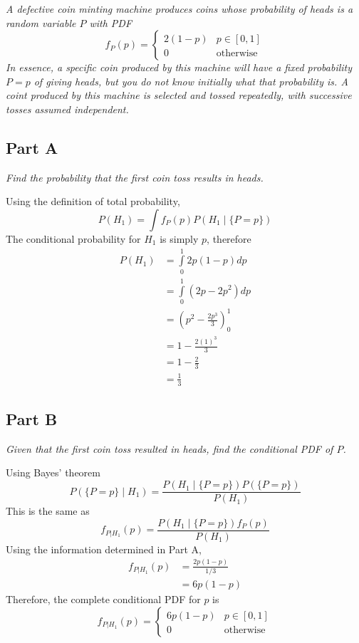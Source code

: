 \documentclass{article}
\begin{document}
\textit{A defective coin minting machine produces coins whose probability of
heads is a random variable $P$ with PDF}
$$ f_P(p) = \begin{cases}
    2(1 - p) & p \in [0, 1] \\
    0 & \mathrm{otherwise}
\end{cases} $$
\textit{In essence, a specific coin produced by this machine will have a
fixed probability $P = p$ of giving heads, but you do not know initially what
that probability is. A coint produced by this machine is selected and tossed
repeatedly, with successive tosses assumed independent.}

\subsection*{Part A}

\textit{Find the probability that the first coin toss results in heads.}

\bigbreak

Using the definition of total probability,
$$ P(H_1) = \int f_P(p) P(H_1 \mid \{P = p\}) $$
The conditional probability for $H_1$ is simply $p$, therefore
\begin{align*}
    P(H_1) &= \int\limits_0^1 2 p (1 - p) dp \\
    &= \int\limits_0^1 (2 p - 2 p ^2) dp \\
    &= \left( p^2 - \frac{2p^3}{3} \right)_0^1 \\
    &= 1 - \frac{2(1)^3}{3} \\
    &= 1 - \frac{2}{3} \\
    &= \frac{1}{3}
\end{align*}

\subsection*{Part B}

\textit{Given that the first coin toss resulted in heads, find the
conditional PDF of $P$.}

\bigbreak

Using Bayes' theorem
$$ P(\{P = p\} \mid H_1) = \frac{P(H_1 \mid \{P = p\}) P(\{P = p\})}{P(H_1)} $$
This is the same as
$$ f_{P|H_1}(p) = \frac{P(H_1 \mid \{P = p\}) f_P(p)}{P(H_1)} $$
Using the information determined in Part A,
\begin{align*}
    f_{P|H_1}(p) &= \frac{2p(1 - p)}{1/3} \\
    &= 6p(1 - p)
\end{align*}
Therefore, the complete conditional PDF for $p$ is
$$ f_{P|H_1}(p) = \begin{cases}
    6p(1 - p) & p \in [0, 1] \\
    0 & \mathrm{otherwise}
\end{cases} $$
\end{document}
